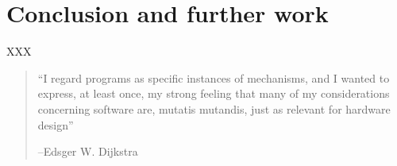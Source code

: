 \section{Conclusion and further work}

XXX

\begin{quotation}
  ``I regard programs as specific instances of mechanisms, and I wanted
  to express, at least once, my strong feeling that many of my
  considerations concerning software are, mutatis mutandis, just as
  relevant for hardware design''

  --Edsger W. Dijkstra
\end{quotation}

